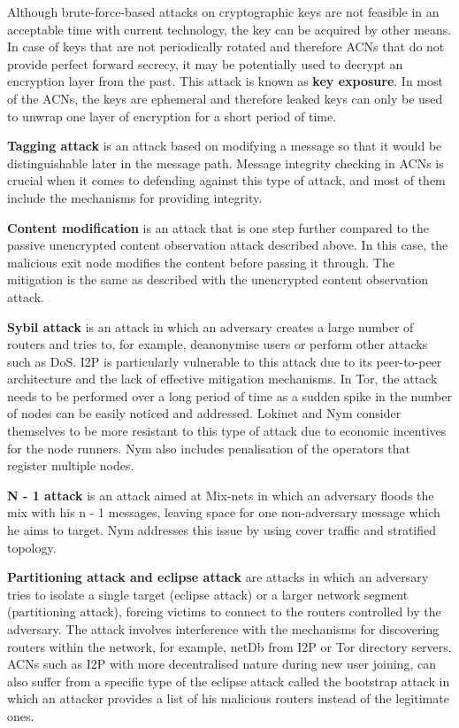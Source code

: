 Although brute-force-based attacks on cryptographic keys are not feasible in an acceptable time with current technology, the key can be acquired by other means. In case of keys that are not periodically rotated and therefore ACNs that do not provide perfect forward secrecy, it may be potentially used to decrypt an encryption layer from the past. This attack is known as \textbf{key exposure}. In most of the ACNs, the keys are ephemeral and therefore leaked keys can only be used to unwrap one layer of encryption for a short period of time.

\textbf{Tagging attack} is an attack based on modifying a message so that it would be distinguishable later in the message path. Message integrity checking in ACNs is crucial when it comes to defending against this type of attack, and most of them include the mechanisms for providing integrity.

\textbf{Content modification} is an attack that is one step further compared to the passive unencrypted content observation attack described above. In this case, the malicious exit node modifies the content before passing it through. The mitigation is the same as described with the unencrypted content observation attack.

\textbf{Sybil attack} is an attack in which an adversary creates a large number of routers and tries to, for example, deanonymise users or perform other attacks such as DoS. I2P is particularly vulnerable to this attack due to its peer-to-peer architecture and the lack of effective mitigation mechanisms. In Tor, the attack needs to be performed over a long period of time as a sudden spike in the number of nodes can be easily noticed and addressed. Lokinet and Nym consider themselves to be more resistant to this type of attack due to economic incentives for the node runners. Nym also includes penalisation of the operators that register multiple nodes.

\textbf{N - 1 attack} is an attack aimed at Mix-nets in which an adversary floods the mix with his n - 1 messages, leaving space for one non-adversary message which he aims to target. Nym addresses this issue by using cover traffic and stratified topology.

\textbf{Partitioning attack and eclipse attack} are attacks in which an adversary tries to isolate a single target (eclipse attack) or a larger network segment (partitioning attack), forcing victims to connect to the routers controlled by the adversary. The attack involves interference with the mechanisms for discovering routers within the network, for example, netDb from I2P or Tor directory servers. ACNs such as I2P with more decentralised nature during new user joining, can also suffer from a specific type of the eclipse attack called the bootstrap attack in which an attacker provides a list of his malicious routers instead of the legitimate ones.

